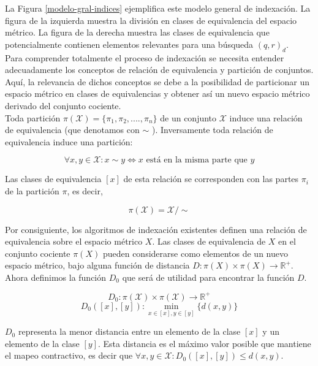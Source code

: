 La Figura \ref{modelo-gral-indices} ejemplifica este modelo general de indexaci\'on. La figura de la izquierda muestra la divisi\'on en clases de equivalencia del espacio m\'etrico. La figura de la derecha muestra las clases de equivalencia que potencialmente contienen elementos relevantes para una b\'usqueda $(q,r)_d$.\\

Para comprender totalmente el proceso de indexaci\'on se necesita entender adecuadamente los conceptos de relaci\'on de equivalencia y partici\'on de conjuntos. Aqu\'i, la relevancia de dichos conceptos se debe a la posibilidad de particionar un espacio m\'etrico en clases de equivalencias y obtener as\'i un nuevo espacio m\'etrico derivado del conjunto cociente.\\

Toda partici\'on $\pi(\mathcal{X}) = \{\pi_1, \pi_2,...., \pi_n\}$ de un conjunto $\mathcal{X}$ induce una relaci\'on de equivalencia (que denotamos con $\sim$ ). Inversamente toda relaci\'on de equivalencia induce una partici\'on:

\[
\forall x,y  \in \mathcal{X}: x \sim y  \Leftrightarrow x \mbox{ est\'a en la misma parte que } y
\]


Las clases de equivalencia $[x]$ de esta relaci\'on se corresponden con las partes $\pi_i$ de la partici\'on $\pi$, es decir,

\[
\pi(\mathcal{X}) = \mathcal{X}/\sim
\]


Por consiguiente, los algoritmos de indexaci\'on existentes definen una relaci\'on de equivalencia sobre el espacio m\'etrico $X$. Las clases de equivalencia de $X$ en el conjunto cociente $\pi(X)$ pueden considerarse como elementos de un nuevo espacio m\'etrico, bajo alguna funci\'on de distancia $D: \pi(X)  \times \pi(X) \rightarrow  \mathbb R^+$.\\

Ahora definimos la funci\'on $D_0$ que ser\'a de utilidad para encontrar la funci\'on $D$.

\[
D_0: 	\pi(\mathcal{X}) \times \pi(\mathcal{X})  \rightarrow \mathbb R^+
\]
\[
D_0([x],[y]): \min_{x \in [x], y \in [y]}\{d(x,y)\}
\]
			
$D_0$ representa la menor distancia entre un elemento de la clase $[x]$ y un elemento de la clase $[y]$. Esta distancia es el m\'aximo valor posible que mantiene el mapeo contractivo, es decir que $\forall x,y \in \mathcal{X} : D_0([x],[y]) \leq d(x,y)$.\\
					

